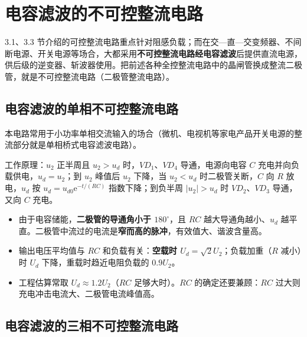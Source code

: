 
\section{电容滤波的不可控整流电路}

3.1、3.3 节介绍的可控整流电路重点针对阻感负载；而在交—直—交变频器、不间断电源、开关电源等场合，大都采用\textbf{不可控整流电路经电容滤波}后提供直流电源，供后级的逆变器、斩波器使用。把前述各种全控整流电路中的晶闸管换成整流二极管，就是不可控整流电路（二极管整流电路）。

\subsection{电容滤波的单相不可控整流电路}

本电路常用于小功率单相交流输入的场合（微机、电视机等家电产品开关电源的整流部分就是单相桥式电容滤波电路）。

工作原理：$u_2$ 正半周且 $u_2>u_d$ 时，$VD_1$、$VD_4$ 导通，电源向电容 $C$ 充电并向负载供电，$u_d=u_2$；到 $u_2$ 峰值后 $u_2$ 下降，当 $u_2<u_d$ 时二极管关断，$C$ 向 $R$ 放电，$u_d$ 按 $u_d=u_{d0}\mathrm{e}^{-t/(RC)}$ 指数下降；到负半周 $|u_2|>u_d$ 时 $VD_2$、$VD_3$ 导通，又向 $C$ 充电。

\begin{itemize}
  \item 由于电容储能，\textbf{二极管的导通角小于 $180^\circ$}，且 $RC$ 越大导通角越小、$u_d$ 越平直。二极管中流过的电流是\textbf{窄而高的脉冲}，有效值大、谐波含量高。
  \item 输出电压平均值与 $RC$ 和负载有关：\textbf{空载时 $U_d=\sqrt{2}U_2$}；负载加重（$R$ 减小）时 $U_d$ 下降，重载时趋近电阻负载的 $0.9U_2$。
  \item 工程估算常取 $U_d\approx1.2U_2$（$RC$ 足够大时）。$RC$ 的确定还要兼顾：$RC$ 过大则充电冲击电流大、二极管电流峰值高。
\end{itemize}


\subsection{电容滤波的三相不可控整流电路}

